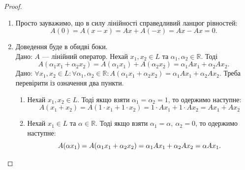 \documentclass{math_library}
\begin{document}
	\begin{proof}
	\begin{enumerate}[topsep=0cm, wide=0pt, label={\arabic*)}]
	\item Просто зауважимо, що в силу лінійності справедливий ланцюг рівностей:
	\[
	A(0) = A(x - x) = Ax + A(-x) = Ax - Ax = 0.
	\]
	
	\item Доведення буде в обидві боки.\\
	\rightproof Дано: $A$ --- лінійний оператор. Нехай $x_1,x_2 \in L$ та $\alpha_1,\alpha_2 \in \mathbb{R}$. Тоді
	\[
	A(\alpha_1 x_1 + \alpha_2 x_2) = A(\alpha_1 x_1) + A(\alpha_2 x_2) = \alpha_1 Ax_1 + \alpha_2 Ax_2.
	\]
	\leftproof Дано: $\forall x_1,x_2 \in L: \forall \alpha_1, \alpha_2 \in \mathbb{R}: A(\alpha_1 x_1 + \alpha_2 x_2) = \alpha_1 Ax_1 + \alpha_2 Ax_2$. Треба перевірити із означення два пункти.
	\begin{enumerate}[nosep,wide=0pt,label={\arabic*))}]
	\item Нехай $x_1,x_2 \in L$. Тоді якщо взяти $\alpha_1 = \alpha_2 = 1$, то одержимо наступне:
	\[
	A(x_1 + x_2) = A(1 \cdot x_1 + 1 \cdot x_2) = 1 \cdot Ax_1 + 1 \cdot Ax_2 = Ax_1 + Ax_2
	\]
	\item Нехай $x_1 \in L$ та $\alpha \in \mathbb{R}$. Тоді якщо взяти $\alpha_1 = \alpha,\ \alpha_2 = 0$, то одержимо наступне:
	\[
	A(\alpha x_1) = A(\alpha_1 x_1 + \alpha_2 x_2) = \alpha_1 A x_1 + \alpha_2 A x_2 = \alpha A x_1. \qedhere
	\]
	\end{enumerate}
	\end{enumerate}
	\end{proof}
	
\end{document}
